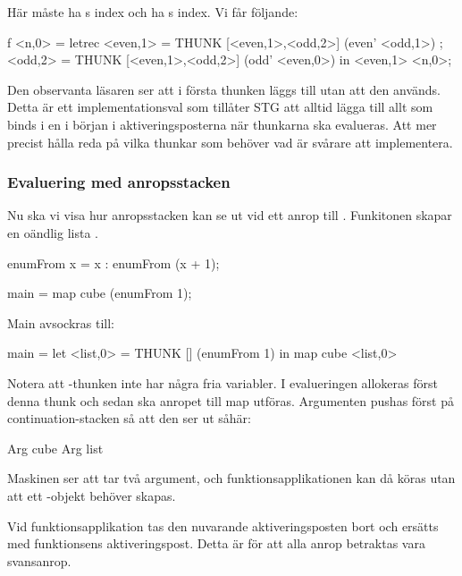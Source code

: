 \documentclass[../Core]{subfiles}
\begin{document}
Här måste  ha s index och  ha s index. Vi får följande:

\begin{codeEx}
f <n,0> = letrec 
    { <even,1> = THUNK [<even,1>,<odd,2>] (even' <odd,1>)
    ; <odd,2>  = THUNK [<even,1>,<odd,2>] (odd' <even,0>)
    } in <even,1> <n,0>;
\end{codeEx}

Den observanta läsaren ser att i första thunken läggs  till utan att den används. 
Detta är ett implementationsval som tillåter STG att alltid lägga till allt som 
binds i en  i början i aktiveringsposterna när thunkarna ska evalueras. 
Att mer precist hålla reda på vilka thunkar som behöver vad är svårare att implementera.




\subsubsection{Evaluering med anropsstacken}



Nu ska vi visa hur anropsstacken kan se ut vid ett anrop till .
Funkitonen  skapar en oändlig lista \ic{[x, x+1, x+2, ...]}.
 
\begin{codeEx}
enumFrom x = x : enumFrom (x + 1);

main = map cube (enumFrom 1);
\end{codeEx}

Main avsockras till:
\begin{codeEx}
main = let <list,0> = THUNK [] (enumFrom 1)
       in  map cube <list,0>
\end{codeEx}



Notera att -thunken inte har några fria variabler.
I evalueringen allokeras först denna thunk och sedan ska anropet till map
utföras. 
Argumenten pushas först på continuation-stacken så att den ser ut såhär:
\begin{codeEx}
Arg cube
Arg list
\end{codeEx}

Maskinen ser att  tar två argument, och funktionsapplikationen 
kan då köras utan att ett -objekt behöver skapas.

Vid funktionsapplikation tas den nuvarande aktiveringsposten bort och ersätts 
med funktionsens aktiveringspost. Detta är för att alla anrop betraktas vara
svansanrop.
\end{document}
